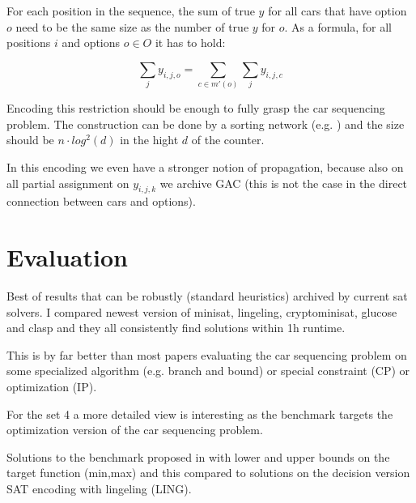 \documentclass[]{llncs}
\begin{document}
For each position in the sequence, the
sum of true $y$ for all cars that have option $o$ need to be the same
size as the number of true $y$ for $o$. As a formula, for all positions
$i$ and options $ o \in O$ it has to hold: 

$$ \sum_{j} y_{i,j,o} = \sum_{c \in m'(o)} \sum_j y_{i,j,c} $$

Encoding this restriction should be enough to fully grasp the car
sequencing problem. The construction can be done by a sorting network
(e.g. \cite{Batcher68} ) and the size should be $n\cdot log^2 (d) $ in the
hight $d$ of the counter. 

In this encoding we  even have a stronger notion of propagation, because
also on all partial assignment on $y_{i,j,k}$ we archive GAC (this is not
the case in the direct connection between cars and options). 

\section{Evaluation}

Best of results that can be robustly (standard heuristics) archived by
current sat solvers. I compared newest version of minisat, lingeling,
cryptominisat, glucose and clasp and they all consistently find
solutions within 1h runtime. 

\DTLsetseparator{,}

\begin{table}[htbp]
    \caption{}
    \centering
\end{table}


This is by far better than most papers evaluating the car sequencing
problem on some specialized algorithm (e.g. branch and bound) or special
constraint (CP) or optimization (IP). 

For the set 4 a more detailed view is interesting as the benchmark
targets the optimization version of the car sequencing problem. 

\DTLsetseparator{,}

\begin{table}[htbp]
    \caption{Solutions to the benchmark proposed in \cite{Gravel05} with
    lower and upper bounds on the target function (min,max) and this
compared to solutions on the decision version  SAT encoding with lingeling (LING). }
    \centering
\end{table}
\end{document}
